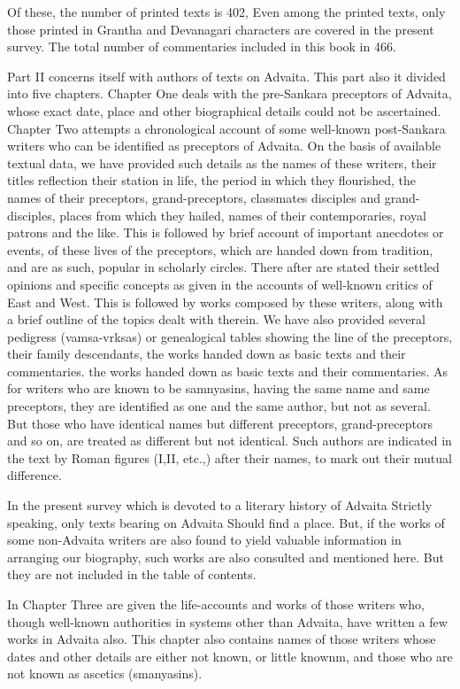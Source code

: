 Of these, the number of printed texts is 402, Even among the printed texts, only those printed in Grantha and Devanagari characters are covered in the present survey. The total number of commentaries included in this book in 466. 

Part II concerns itself with authors of texts on Advaita. This part also it divided into five chapters. Chapter One deals with the pre-Sankara preceptors of Advaita, whose exact date, place and other biographical details could not be ascertained. Chapter Two attempts a chronological account of some well-known post-Sankara writers who can be identified as preceptors of Advaita. On the basis of available textual data, we have provided such details as the names of these writers, their titles reflection their station in life, the period in which they flourished, the names of their preceptors, grand-preceptors, classmates disciples and grand-disciples, places from which they hailed, names of their contemporaries, royal patrons and the like. This is followed by brief account of important anecdotes or events, of these lives of the preceptors, which are handed down from tradition, and are as such, popular in scholarly circles. There after are stated their settled opinions and specific concepts as given in the accounts of well-known critics of East and West. This is followed by works composed by these writers, along with a brief outline of the topics dealt with therein. We have also provided several pedigress (vamsa-vrksas) or  genealogical tables showing the line of the preceptors, their family descendants, the works handed down as basic texts and their commentaries. the works handed down as basic texts and their commentaries. As for writers who are known to be samnyasins, having the same name and same preceptors, they are identified as one and the same author, but not as several. But those who have identical names but different preceptors, grand-preceptors and so on, are treated as different but not identical. Such authors are indicated in the text by Roman figures (I,II, etc.,) after their names, to mark out their mutual difference.

In the present survey which is devoted to a literary history of Advaita Strictly speaking, only texts bearing on Advaita Should find a place. But, if the works of some non-Advaita writers are also found to yield valuable information in arranging our biography, such works are also consulted and mentioned here. But they are not included in the table of contents. 

In Chapter Three are given the life-accounts and works of those writers who, though well-known authorities in systems other than Advaita, have written a few works in Advaita also. This chapter also contains names of those writers whose dates and other details are either not known, or little knownm, and those who are not known as ascetics (smanyasins).

